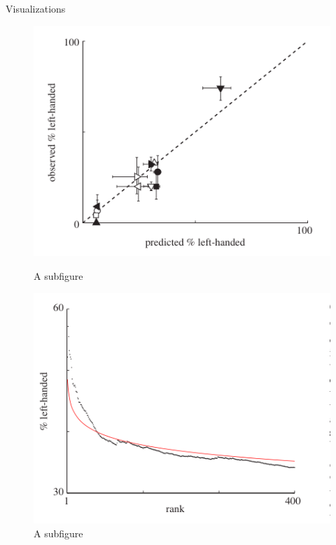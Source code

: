 \documentclass{beamer}
\begin{document}
    \begin{frame}{Visualizations}
      \begin{figure}
        \centering
        \begin{minipage}{.5\textwidth}
            \centering
            \includegraphics[width=1\linewidth]{ObVSPredLH}
            \caption{A subfigure}
        \end{minipage}%
        \begin{minipage}{.5\textwidth}
            \centering
            \includegraphics[width=1\linewidth]{CumuFracLH}
            \caption{A subfigure}
        \end{minipage}
        
    \end{figure}
    \end{frame}
\end{document}
